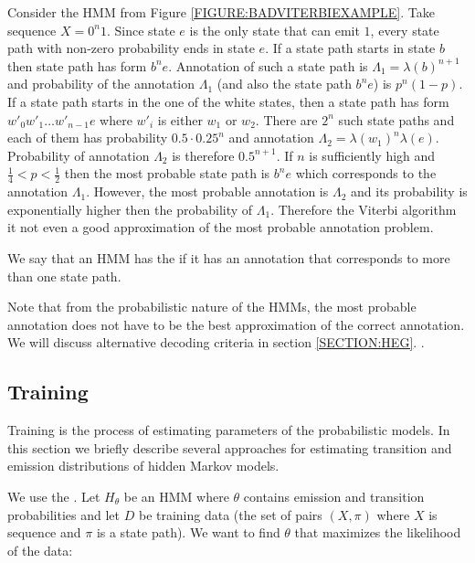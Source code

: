 \begin{example} 
Consider the HMM from Figure \ref{FIGURE:BADVITERBIEXAMPLE}. Take sequence
$X=0^n1$.  Since state $e$ is the only state that can emit $1$, every state
path with non-zero probability ends in state $e$. If a state path starts in
state $b$ then state path has form $b^ne$. Annotation of such a state path is
$\Lambda_1=\lambda(b)^{n+1}$ and probability of the annotation $\Lambda_1$ (and
also the state path $b^ne$) is $p^n(1-p)$.  If a state path starts in the one
of the white states, then a state path has form $w'_0w'_1\dots w'_{n-1}e$ where
$w'_i$ is either $w_1$ or $w_2$.  There are $2^n$ such state paths and each of
them has probability $0.5\cdot 0.25^n$ and annotation
$\Lambda_2=\lambda(w_1)^n\lambda(e)$. Probability of annotation $\Lambda_2$ is
therefore $0.5^{n+1}$.  If $n$ is sufficiently high and $\frac14<p<\frac12$
then the most probable state path is $b^ne$ which corresponds to the annotation
$\Lambda_1$. However, the most probable annotation is $\Lambda_2$ and its
probability is exponentially higher then the probability of $\Lambda_1$.
Therefore the Viterbi algorithm it not even a good approximation of the most
probable annotation problem.

We say that an HMM has the  if it has an
annotation that corresponds to more than one state path.
\end{example}


Note that from the probabilistic nature of the HMMs, the most probable
annotation does not have to be the best approximation of the correct annotation.
We will discuss alternative decoding criteria in section \ref{SECTION:HEG}.
\nocite{Brown2010,Gross2007,Nanasi2010,Truszkowski2011}.


\subsection{Training} 

Training is the process of estimating parameters of the probabilistic models. In this
section we briefly describe several approaches for estimating transition and
emission distributions of hidden Markov models.

We use the . Let $H_{\theta}$ be an HMM
where $\theta$ contains emission and transition probabilities and
let $D$ be training data (the set of pairs $(X,\pi)$ where $X$ is sequence and $\pi$ is a state path).  We
want to find $\theta$ that maximizes the likelihood of the data:

